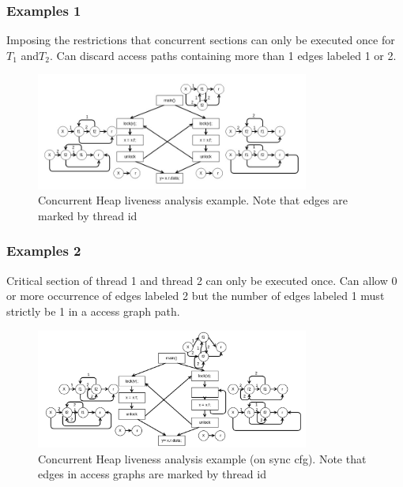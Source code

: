 \documentclass{beamer}
\begin{document}
\begin{frame}
	\frametitle{Examples 1}
	Imposing the restrictions that concurrent sections can only be executed once for $T_1$ and$T_2$. Can discard  access paths containing more than 1 edges labeled 1 or 2.
	\begin{figure}
		\centering
		\includegraphics[width=0.8\textwidth]{Figures/conc_analysis_thr_itr3.jpg}
		\caption{Concurrent Heap liveness analysis example. Note that edges are marked by thread id}
		\label{fig:threadidanalysis}
	\end{figure}
\end{frame}

\begin{frame}
	\frametitle{Examples 2}
	 Critical section of thread 1 and thread 2 can only be executed once. Can allow 0 or more occurrence of edges labeled 2 but the number of edges labeled 1 must strictly be 1 in a access graph path.
	\begin{figure}
		\centering
		\includegraphics[width=0.8\textwidth]{Figures/rsz_loop_inside.png}
		\caption{Concurrent Heap liveness analysis example (on sync cfg). Note that edges in access graphs are marked by thread id}
		\label{fig:threadidanalysis}
	\end{figure}
\end{frame}
\end{document}
